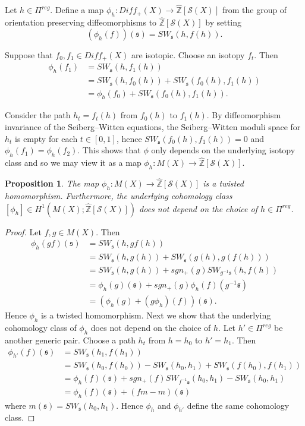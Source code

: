 \documentclass{amsart}
\newtheorem{proposition}[theorem]{Proposition}
\theoremstyle{definition}
\theoremstyle{remark}
\numberwithin{equation}{section}
\begin{document}
Let $h \in \Pi^{reg}$. Define a map $\phi_h : Diff_+(X) \to \widehat{\mathbb{Z}}[\mathcal{S}(X)]$ from the group of orientation preserving diffeomorphisms to $\widehat{\mathbb{Z}}[\mathcal{S}(X)]$ by setting
\[
(\phi_h(f))(\mathfrak{s}) = SW_{\mathfrak{s}}( h , f(h)).
\]

Suppose that $f_0,f_1 \in Diff_+(X)$ are isotopic. Choose an isotopy $f_t$. Then 
\begin{align*}
\phi_h(f_1) &= SW_{\mathfrak{s}}( h , f_1(h))\\
& = SW_{\mathfrak{s}}(h , f_0(h)) + SW_{\mathfrak{s}}( f_0(h) , f_1(h) ) \\
&= \phi_h(f_0) + SW_{\mathfrak{s}}( f_0(h) , f_1(h) ).
\end{align*}

Consider the path $h_t = f_t(h)$ from $f_0(h)$ to $f_1(h)$. By diffeomorphism invariance of the Seiberg--Witten equations, the Seiberg--Witten moduli space for $h_t$ is empty for each $t \in [0,1]$, hence $SW_{\mathfrak{s}}( f_0(h) , f_1(h) ) = 0$ and $\phi_h(f_1) = \phi_h(f_2)$. This shows that $\phi$ only depends on the underlying isotopy class and so we may view it as a map $\phi_h : M(X) \to \widehat{\mathbb{Z}}[\mathcal{S}(X)]$.

\begin{proposition}\label{prop:cocyc}
The map $\phi_h : M(X) \to \widehat{\mathbb{Z}}[\mathcal{S}(X)]$ is a twisted homomorphism. Furthermore, the underlying cohomology class $[\phi_h] \in H^1( M(X) ; \widehat{\mathbb{Z}}[\mathcal{S}(X)])$ does not depend on the choice of $h \in \Pi^{reg}$.
\end{proposition}
\begin{proof}
Let $f,g \in M(X)$. Then
\begin{align*}
\phi_h(gf)(\mathfrak{s}) &= SW_{\mathfrak{s}}( h , gf(h) ) \\
&= SW_{\mathfrak{s}}(h , g(h) ) + SW_{\mathfrak{s}}( g(h) , g(f(h)) ) \\
&= SW_{\mathfrak{s}}(h , g(h) ) + sgn_+(g) SW_{ g^{-1}\mathfrak{s}}( h , f(h) ) \\
&= \phi_h(g)(\mathfrak{s}) + sgn_+(g)\phi_h(f)( g^{-1}\mathfrak{s} ) \\
&= ( \phi_h(g) + (g\phi_h)(f) )(\mathfrak{s}).
\end{align*}
Hence $\phi_h$ is a twisted homomorphism. Next we show that the underlying cohomology class of $\phi_h$ does not depend on the choice of $h$. Let $h' \in \Pi^{reg}$ be another generic pair. Choose a path $h_t$ from $h = h_0$ to $h' = h_1$. Then
\begin{align*}
\phi_{h'}(f)(\mathfrak{s}) &= SW_{\mathfrak{s}}( h_1 , f(h_1) ) \\
&= SW_{\mathfrak{s}}( h_0 , f(h_0) ) - SW_{\mathfrak{s}}(h_0 , h_1) + SW_{\mathfrak{s}}( f(h_0) , f(h_1) ) \\
&= \phi_h(f)(\mathfrak{s}) + sgn_+(f) SW_{f^{-1}\mathfrak{s}}( h_0 , h_1 ) - SW_{\mathfrak{s}}(h_0 , h_1) \\
&= \phi_h(f)(\mathfrak{s}) + (fm-m)(\mathfrak{s})
\end{align*}
where $m(\mathfrak{s}) = SW_{\mathfrak{s}}( h_0 , h_1 )$. Hence $\phi_h$ and $\phi_{h'}$ define the same cohomology class.
\end{proof}
\end{document}
